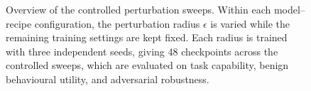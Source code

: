 \begin{figure}[tbp]
{%
    }

    \caption{Overview of the controlled perturbation sweeps. Within each model--recipe configuration, the perturbation radius $\epsilon$ is varied while the remaining training settings are kept fixed. Each radius is trained with three independent seeds, giving 48 checkpoints across the controlled sweeps, which are evaluated on task capability, benign behavioural utility, and adversarial robustness. 
    }
    \label{fig:sweep_diagram}
\end{figure}